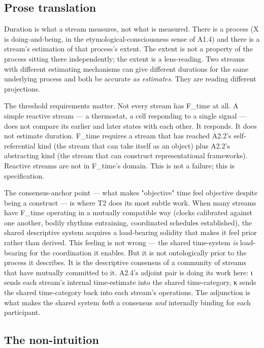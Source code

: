 \documentclass[11pt, openany]{book}
\begin{document}
\subsection{Prose translation}

Duration is what a stream measures, not what is measured. There is a process (X is doing-and-being, in the etymological-consciousness sense of A1.4) and there is a stream's estimation of that process's extent. The extent is not a property of the process sitting there independently; the extent is a lens-reading. Two streams with different estimating mechanisms can give different durations for the same underlying process and both be accurate \textit{as estimates}. They are reading different projections.

The threshold requirements matter. Not every stream has F\_\allowbreak{}time at all. A simple reactive stream --- a thermostat, a cell responding to a single signal --- does not compare its earlier and later states with each other. It responds. It does not estimate duration. F\_\allowbreak{}time requires a stream that has reached A2.2's self-referential kind (the stream that can take itself as an object) plus A2.2's abstracting kind (the stream that can construct representational frameworks). Reactive streams are not in F\_\allowbreak{}time's domain. This is not a failure; this is specification.

The consensus-anchor point --- what makes "objective" time feel objective despite being a construct --- is where T2 does its most subtle work. When many streams have F\_\allowbreak{}time operating in a mutually compatible way (clocks calibrated against one another, bodily rhythms entraining, coordinated schedules established), the shared descriptive system acquires a load-bearing solidity that makes it feel prior rather than derived. This feeling is not wrong --- the shared time-system \textit{is} load-bearing for the coordination it enables. But it is not ontologically prior to the process it describes. It is the descriptive consensus of a community of streams that have mutually committed to it. A2.4's adjoint pair is doing its work here: ι sends each stream's internal time-estimate into the shared time-category, κ sends the shared time-category back into each stream's operations. The adjunction is what makes the shared system \textit{both} a consensus \textit{and} internally binding for each participant.

\subsection{The non-intuition}
\end{document}
